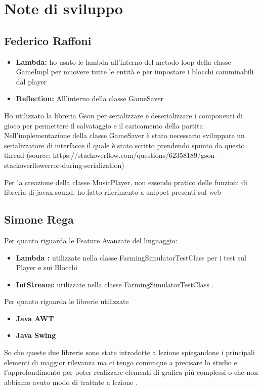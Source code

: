 \documentclass[a4paper,12pt]{report}
\begin{document}
\section{Note di sviluppo}

\subsection{Federico Raffoni}

\begin{itemize}
	\item \textbf{Lambda:} ho usato le lambda all’interno del metodo loop della classe GameImpl per muovere tutte le entità e per impostare i blocchi camminabili dal player
	\item\textbf{Reflection:} All’interno della classe GameSaver
\end{itemize}

Ho utilizzato la libreria Gson per serializzare e deserializzare i componenti di gioco per permettere il salvataggio e il caricamento della partita.
Nell’implementazione della classe GameSaver è stato necessario sviluppare un serializzatore di interfacce il quale è stato scritto prendendo spunto da questo thread (source: https://stackoverflow.com/questions/62358189/gson-stackoverflowerror-during-serialization)

Per la creazione della classe MusicPlayer, non essendo pratico delle funzioni di libreria di javax.sound, ho fatto riferimento a snippet presenti sul web


\subsection{Simone Rega}
Per quanto riguarda le Feature Avanzate del linguaggio: 
\begin{itemize}
	\item \textbf{Lambda :} utilizzate nella classe FarmingSimulatorTestClass per i test sul Player e sui Blocchi	
	\item \textbf{IntStream: }utilizzate nella classe FarmingSimulatorTestClass .
\end{itemize}

\hfill\break
Per quanto riguarda le librerie utilizzate
\begin{itemize}
	\item \textbf{Java AWT }
	\item \textbf{Java Swing}
\end{itemize}
So che queste due librerie sono state introdotte a lezione spiegandone i principali elementi di maggior rilevanza ma ci tengo comunque a precisare lo studio e l'approfondimento per poter realizzare elementi di grafica più complessi o che non abbiamo avuto modo di trattate a lezione .
 
\end{document}
